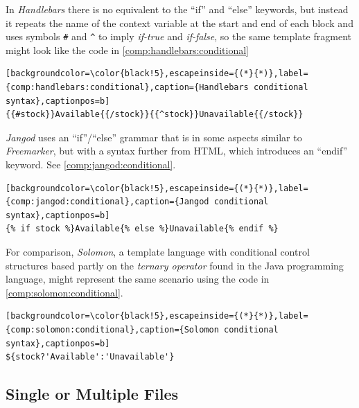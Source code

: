 In \emph{Handlebars} there is no equivalent to the \enquote{if} and \enquote{else} keywords, but instead it repeats the name of the context variable at the start and end of each block and uses symbols \verb!#! and \verb!^! to imply \emph{if-true} and \emph{if-false}, so the same template fragment might look like the code in \autoref{comp:handlebars:conditional}

\begin{lstlisting}[backgroundcolor=\color{black!5},escapeinside={(*}{*)},label={comp:handlebars:conditional},caption={Handlebars conditional syntax},captionpos=b]
{{#stock}}Available{{/stock}}{{^stock}}Unavailable{{/stock}}
\end{lstlisting}

\emph{Jangod} uses an \enquote{if}/\enquote{else} grammar that is in some aspects similar to \emph{Freemarker}, but with a syntax further from HTML, which introduces an \enquote{endif} keyword. See \autoref{comp:jangod:conditional}.

\begin{lstlisting}[backgroundcolor=\color{black!5},escapeinside={(*}{*)},label={comp:jangod:conditional},caption={Jangod conditional syntax},captionpos=b]
{% if stock %}Available{% else %}Unavailable{% endif %}
\end{lstlisting}

For comparison, \emph{Solomon}, a \gls{template language} with conditional control structures based partly on the \emph{ternary operator} \citep{Oracle2021} found in the Java \gls{programming language}, might represent the same scenario using the code in \autoref{comp:solomon:conditional}.

\begin{lstlisting}[backgroundcolor=\color{black!5},escapeinside={(*}{*)},label={comp:solomon:conditional},caption={Solomon conditional syntax},captionpos=b]
${stock?'Available':'Unavailable'}
\end{lstlisting}

\subsection{Single or Multiple Files}
\label{comp:singlemultiple}

